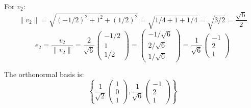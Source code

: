 For $v_2$:
\[
\|v_2\| = \sqrt{(-1/2)^2 + 1^2 + (1/2)^2} = \sqrt{1/4 + 1 + 1/4} = \sqrt{3/2} = \frac{\sqrt{6}}{2}
\]
\[
e_2 = \frac{v_2}{\|v_2\|} = \frac{2}{\sqrt{6}} \begin{pmatrix} -1/2 \\ 1 \\ 1/2 \end{pmatrix} = \begin{pmatrix} -1/\sqrt{6} \\ 2/\sqrt{6} \\ 1/\sqrt{6} \end{pmatrix} = \frac{1}{\sqrt{6}} \begin{pmatrix} -1 \\ 2 \\ 1 \end{pmatrix}
\]

The orthonormal basis is:
\[
\left\{ \frac{1}{\sqrt{2}} \begin{pmatrix} 1 \\ 0 \\ 1 \end{pmatrix}, \frac{1}{\sqrt{6}} \begin{pmatrix} -1 \\ 2 \\ 1 \end{pmatrix} \right\}
\]
